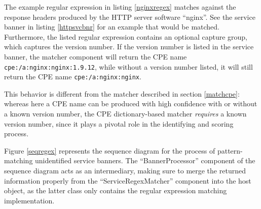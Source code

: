 \documentclass[a4paper,12pt]{article}
\begin{document}
	The example regular expression in listing \ref{nginxregex} matches against the response headers produced by the HTTP server software ``nginx''. See the service banner in listing \ref{httpsvcbnr} for an example that would be matched. Furthermore, the listed regular expression contains an optional capture group, which captures the version number. If the version number is listed in the service banner, the matcher component will return the CPE name \texttt{cpe:/a:nginx:nginx:1.9.12}, while without a version number listed, it will still return the CPE name \texttt{cpe:/a:nginx:nginx}.
	
	This behavior is different from the matcher described in section \ref{matchcpe}: whereas here a CPE name can be produced with high confidence with or without a known version number, the CPE dictionary-based matcher \textit{requires} a known version number, since it plays a pivotal role in the identifying and scoring process.
	
	Figure \ref{seqregex} represents the sequence diagram for the process of pattern-matching unidentified service banners. The ``BannerProcessor'' component of the sequence diagram acts as an intermediary, making sure to merge the returned information properly from the ``ServiceRegexMatcher'' component into the host object, as the latter class only contains the regular expression matching implementation.
	
\end{document}
